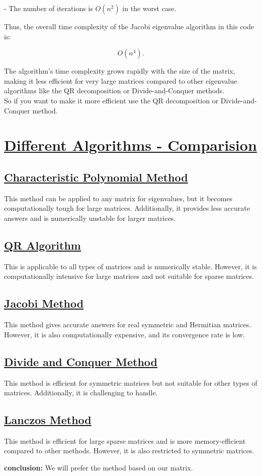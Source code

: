 \documentclass[journal]{IEEEtran}
\begin{document}
- The number of iterations is \( O(n^2) \) in the worst case.

Thus, the overall time complexity of the Jacobi eigenvalue algorithm in this code is:

\[
O(n^4).
\]

The algorithm's time complexity grows rapidly with the size of the matrix, making it less efficient for very large matrices compared to other eigenvalue algorithms like the QR decomposition or Divide-and-Conquer methods.\\So if you want to make it more efficient use the QR decomposition or Divide-and-Conquer method.\\

\section*{\underline{\textbf{Different Algorithms - Comparision}}}

\subsection*{\underline{Characteristic Polynomial Method}}
This method can be applied to any matrix for eigenvalues, but it becomes computationally tough for large matrices. Additionally, it provides less accurate answers and is numerically unstable for larger matrices.

\subsection*{\underline{QR Algorithm}}
This is applicable to all types of matrices and is numerically stable. However, it is computationally intensive for large matrices and not suitable for sparse matrices.

\subsection*{\underline{Jacobi Method}}
This method gives accurate answers for real symmetric and Hermitian matrices. However, it is also computationally expensive, and its convergence rate is low.

\subsection*{\underline{Divide and Conquer Method}}
This method is efficient for symmetric matrices but not suitable for other types of matrices. Additionally, it is challenging to handle.

\subsection*{\underline{Lanczos Method}}
This method is efficient for large sparse matrices and is more memory-efficient compared to other methods. However, it is also restricted to symmetric matrices.

\textbf{conclusion:} We will prefer the method based on our matrix.
\end{document}
